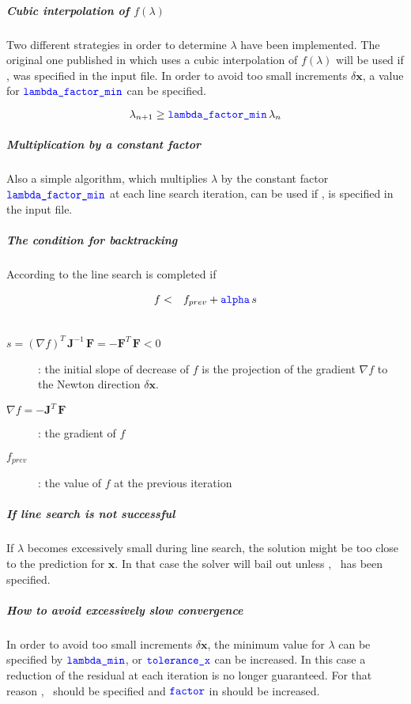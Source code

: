 \subparagraph{Cubic interpolation of $f\left(\lambda\right)$}
Two different strategies in order to determine $\lambda$ have been implemented.
The original one published in \cite{NUMERICAL-RECIPES-IN-C} which uses a cubic interpolation of $f\left(\lambda\right)$ will be used if ,  was specified in the input file.
In order to avoid too small increments $\delta\boldsymbol{x}$, a value for $\textcolor{blue}{\texttt{lambda\_factor\_min}}$ can be specified.

\begin{equation}
\lambda_{n+1} \geq \textcolor{blue}{\texttt{lambda\_factor\_min}} \, \lambda_{n}
\end{equation}

\subparagraph{Multiplication by a constant factor}
Also a simple algorithm, which multiplies $\lambda$ by the constant factor $\textcolor{blue}{\texttt{lambda\_factor\_min}}$ at each line search iteration, can be used if ,  is specified in the input file.

\subparagraph{The condition for backtracking}
According to \cite{NUMERICAL-RECIPES-IN-C} the line search is completed if

\begin{eqnarray}
f &<& f_{prev} + \textcolor{blue}{\texttt{alpha}} \, s \\ \nonumber
\end{eqnarray}

\begin{description}
\item[$s=\left(\nabla f\right)^T\,\boldsymbol{J}^{-1}\,\boldsymbol{F} = -\boldsymbol{F}^T\,\boldsymbol{F} < 0$]:
the initial slope of decrease of $f$ is the projection of the gradient $\nabla f$ to the Newton direction $\delta\boldsymbol{x}$.
\item[$\nabla f=-\boldsymbol{J}^T\,\boldsymbol{F}$]: the gradient of $f$
\item[$f_{prev}$]: the value of $f$ at the previous iteration
\end{description}

\subparagraph{If line search is not successful}
If $\lambda$ becomes excessively small during line search, the solution might be too close to the prediction for $\boldsymbol{x}$.
In that case the solver will bail out unless ,~ has been specified.

\subparagraph{How to avoid excessively slow convergence}
In order to avoid too small increments $\delta\boldsymbol{x}$, the minimum value for $\lambda$ can be specified by $\textcolor{blue}{\texttt{lambda\_min}}$, or $\textcolor{blue}{\texttt{tolerance\_x}}$ can be increased. In this case a reduction of the residual at each iteration is no longer guaranteed. For that reason ,~ should be specified and $\textcolor{blue}{\texttt{factor}}$ in  should be increased.

